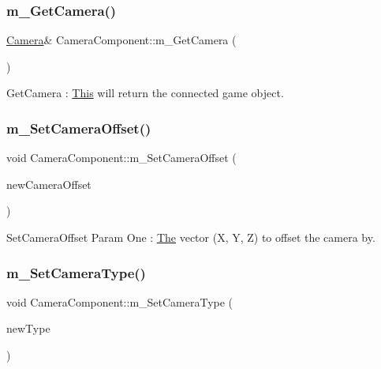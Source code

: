 \subsubsection{\texorpdfstring{m\+\_\+\+Get\+Camera()}{m\_GetCamera()}}
{\footnotesize\ttfamily \mbox{\hyperlink{class_camera}{Camera}}\& Camera\+Component\+::m\+\_\+\+Get\+Camera (\begin{DoxyParamCaption}{ }\end{DoxyParamCaption})\hspace{0.3cm}{\ttfamily [inline]}}

Get\+Camera \+: \mbox{\hyperlink{class_this}{This}} will return the connected game object. \mbox{\label{class_camera_component_a4db1be92619451a81d54269e13232a1f}} 
\subsubsection{\texorpdfstring{m\+\_\+\+Set\+Camera\+Offset()}{m\_SetCameraOffset()}}
{\footnotesize\ttfamily void Camera\+Component\+::m\+\_\+\+Set\+Camera\+Offset (\begin{DoxyParamCaption}\item[{glm\+::vec3}]{new\+Camera\+Offset }\end{DoxyParamCaption})\hspace{0.3cm}{\ttfamily [inline]}}

Set\+Camera\+Offset Param One \+: \mbox{\hyperlink{class_the}{The}} vector (X, Y, Z) to offset the camera by. \mbox{\label{class_camera_component_aee0c00e1dbb83fd953b718e278c90603}} 
\subsubsection{\texorpdfstring{m\+\_\+\+Set\+Camera\+Type()}{m\_SetCameraType()}}
{\footnotesize\ttfamily void Camera\+Component\+::m\+\_\+\+Set\+Camera\+Type (\begin{DoxyParamCaption}\item[{\mbox{\hyperlink{_camera_component_8h_ab07ecb557631c59d8b7ec9c3db110dd5}{camera\+Type}}}]{new\+Type }\end{DoxyParamCaption})\hspace{0.3cm}{\ttfamily [inline]}}

